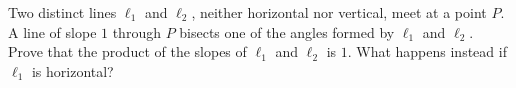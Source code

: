 Two distinct lines $\ell_1$ and $\ell_2$, neither horizontal nor vertical, meet at a point $P$. A line of slope $1$ through $P$ bisects one of the angles formed by $\ell_1$ and $\ell_2$. Prove that the product of the slopes of $\ell_1$ and $\ell_2$ is $1$. What happens instead if $\ell_1$ is horizontal?

